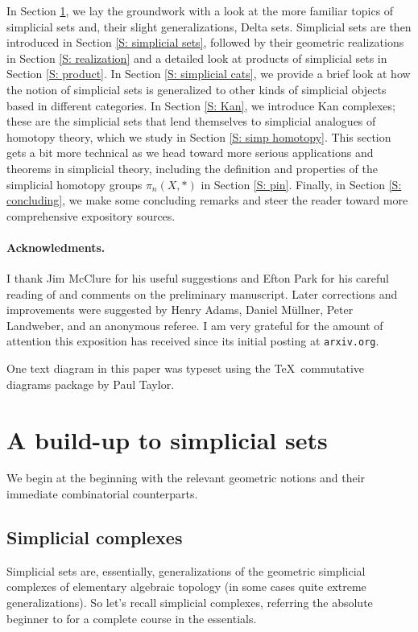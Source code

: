 \documentclass[12pt]{article}
\theoremstyle{plain}
\theoremstyle{definition}
\begin{document}
In Section \ref{S: simplicial complexes}, we lay the groundwork with a look at the more familiar topics of simplicial sets and, their slight generalizations, Delta sets. Simplicial sets are then introduced in Section \ref{S: simplicial sets}, followed by their geometric realizations in Section \ref{S: realization} and a detailed look at products of simplicial sets in Section \ref{S: product}. In Section \ref{S: simplicial cats}, we provide a brief look at how the notion of simplicial sets is generalized to other kinds of simplicial objects based in different categories. In Section \ref{S: Kan}, we introduce Kan complexes; these are the simplicial sets that lend themselves to simplicial analogues of homotopy theory, which we study in Section \ref{S: simp homotopy}. This section gets a bit more technical as we head toward more serious applications and theorems in simplicial theory, including the definition and properties  of the simplicial homotopy groups $\pi_n(X,*)$ in Section \ref{S: pin}. Finally, in Section \ref{S: concluding}, we make some concluding remarks and steer the reader toward more comprehensive expository sources.

\paragraph{Acknowledments.} I thank Jim McClure for his useful suggestions and Efton Park for his careful reading of and comments on the preliminary manuscript. Later corrections and improvements were suggested by Henry Adams, Daniel M\"{u}llner, Peter Landweber, and an anonymous referee. I am very grateful for the amount of attention this exposition has received since its initial posting at \texttt{arxiv.org}. 

One text diagram in this paper was typeset using the \TeX\, commutative
diagrams package by Paul Taylor. 



\section{A build-up to simplicial sets}\label{S: simplicial complexes}

We begin at the beginning with the relevant geometric notions and their immediate combinatorial counterparts.

\subsection{Simplicial complexes}
Simplicial sets are, essentially, generalizations of the geometric simplicial complexes of elementary algebraic topology (in some cases quite extreme generalizations). So let's recall simplicial complexes, referring the absolute beginner to \cite{MK} for a complete course in the essentials. 
\end{document}
